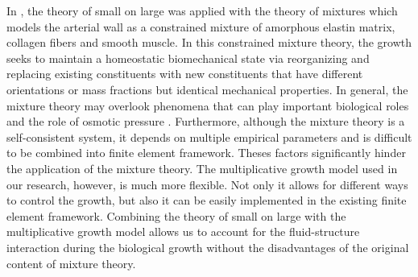 In \cite{Figueroa}, the theory of small on large was applied with the theory of mixtures which models the arterial wall as a constrained mixture of amorphous elastin matrix, collagen fibers and smooth muscle. In this constrained mixture theory, the growth seeks to maintain a homeostatic biomechanical state via reorganizing and replacing existing constituents with new constituents that have different orientations or mass fractions but identical mechanical properties. In general, the mixture theory may overlook phenomena that can play important biological roles and the role of osmotic pressure \cite{Ambrosi}. Furthermore, although the mixture theory is a self-consistent system, it depends on multiple empirical parameters and is difficult to be combined into finite element framework. Theses factors significantly hinder the application of the mixture theory. The multiplicative growth model used in our research, however, is much more flexible. Not only it allows for different ways to control the growth, but also it can be easily implemented in the existing finite element framework. Combining the theory of small on large with the multiplicative growth model allows us to account for the fluid-structure interaction during the biological growth without the disadvantages of the original content of mixture theory.